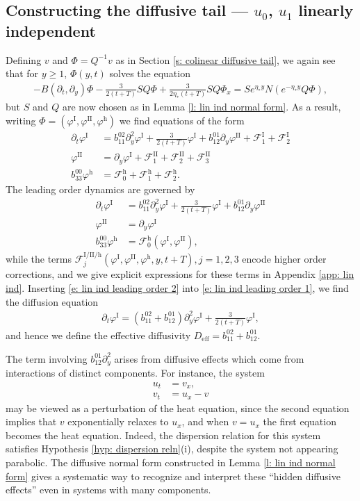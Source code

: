 \documentclass[11pt]{article}
\renewcommand{\phi}{\varphi}
\newcommand{\mcf}{\mathcal{F}}
\numberwithin{equation}{section}
\numberwithin{prop}{section}
\newcommand{\phih}{\phi^\mathrm{h}}
\newcommand{\Deff}{D_\mathrm{eff}}
\newcommand{\phiI}{\phi^\mathrm{I}}
\newcommand{\phiII}{\phi^\mathrm{II}}
\newcommand{\FII}{\mathcal{F}^\mathrm{II}}
\newcommand{\Fh}{\mathcal{F}^\mathrm{h}}
\begin{document}
\subsection{Constructing the diffusive tail --- $u_0$, $u_1$ linearly independent}\label{s: lin ind diffusive tail}
Defining $v$ and $\Phi = Q^{-1} v$ as in Section \ref{s: colinear diffusive tail}, we again see that for $y \geq 1$, $\Phi(y,t)$ solves the equation
\begin{align*}
- B(\partial_t, \partial_y) \Phi - \frac{3}{2 (t+T)} SQ \Phi + \frac{3}{2 \eta_*(t+T)} SQ \Phi_x = S e^{\eta_* y} N(e^{-\eta_* y} Q \Phi), 
\end{align*}
but $S$ and $Q$ are now chosen as in Lemma \ref{l: lin ind normal form}. As a result, writing $\Phi = (\phiI, \phiII, \phih)$ we find equations of the form
\begin{align}
\partial_t \phiI &= b_{11}^{02} \partial_y^2 \phiI + \frac{3}{2(t+T)} \phiI + b_{12}^{01} \partial_y \phiII +  \mcf^\mathrm{I}_1 + \mcf^\mathrm{I}_2 \label{e: lin ind phiI eqn} \\
\phiII &= \partial_y \phiI + \FII_1 + \FII_2 + \FII_3 \\
b_{33}^{00} \phih &= \Fh_0 + \Fh_1 + \Fh_2. \label{e: lin ind phih eqn}
\end{align}
The leading order dynamics are governed by
\begin{align}
\partial_t \phiI &= b_{11}^{02} \partial_y^2 \phiI + \frac{3}{2 (t+T)} \phiI + b_{12}^{01} \partial_y \phiII \label{e: lin ind leading order 1} \\
\phiII &= \partial_y \phiI \label{e: lin ind leading order 2}\\
b_{33}^{00} \phih &= \Fh_0 (\phiI, \phiII), \label{e: lin ind leading order 3}
\end{align}
while the terms $\mathcal{F}^\mathrm{I/II/h}_j (\phiI, \phiII, \phih, y, t+T), j = 1,2,3$ encode higher order corrections, and we give explicit expressions for these terms in Appendix \ref{app: lin ind}. Inserting \eqref{e: lin ind leading order 2} into \eqref{e: lin ind leading order 1}, we find the diffusion equation
\begin{align}
\partial_t \phiI= (b_{11}^{02} + b_{12}^{01}) \partial_y^2 \phiI + \frac{3}{2 (t+T)} \phiI,
\end{align} 
and hence we define the effective diffusivity $\Deff = b_{11}^{02} + b_{12}^{01}$. 

The term involving $b_{12}^{01} \partial_y^2$ arises from diffusive effects which come from interactions of distinct components. For instance, the system 
\begin{align}
u_t &= v_x, \\
v_t & = u_x - v
\end{align}
may be viewed as a perturbation of the heat equation, since the second equation implies that $v$ exponentially relaxes to $u_x$, and when $v = u_x$ the first equation becomes the heat equation. Indeed, the dispersion relation for this system satisfies Hypothesis \ref{hyp: dispersion reln}(i), despite the system not appearing parabolic. The diffusive normal form constructed in Lemma \ref{l: lin ind normal form} gives a systematic way to recognize and interpret these ``hidden diffusive effects'' even in systems with many components. 
\end{document}
